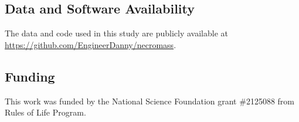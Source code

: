 \documentclass[]{Liebert_Author_revised}
\begin{document}
\subsection*{Data and Software Availability}
The data and code used in this study are publicly available at \url{https://github.com/EngineerDanny/necromass}.

\subsection*{Funding}
This work was funded by the National Science Foundation grant \#2125088 from Rules of Life Program.





\end{document}
